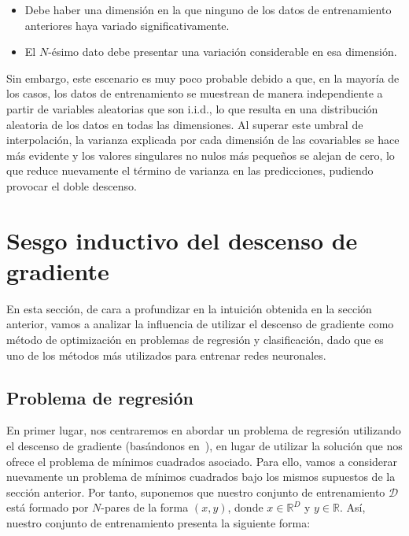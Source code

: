 \begin{itemize}
    \item Debe haber una dimensión en la que ninguno de los datos de entrenamiento anteriores haya variado significativamente.
    \item El $N$-ésimo dato debe presentar una variación considerable en esa dimensión.\newline
\end{itemize}

Sin embargo, este escenario es muy poco probable debido a que, en la mayoría de los casos, los datos de entrenamiento se muestrean de manera independiente a partir de variables aleatorias que son i.i.d., lo que resulta en una distribución aleatoria de los datos en todas las dimensiones. Al superar este umbral de interpolación, la varianza explicada por cada dimensión de las covariables se hace más evidente y los valores singulares no nulos más pequeños se alejan de cero, lo que reduce nuevamente el término de varianza en las predicciones, pudiendo provocar el doble descenso.\newline

\section{Sesgo inductivo del descenso de gradiente}\label{sec:sesgo-implicito-descenso-gradiente}

En esta sección, de cara a profundizar en la intuición obtenida en la sección anterior, vamos a analizar la influencia de utilizar el descenso de gradiente como método de optimización en problemas de regresión y clasificación, dado que es uno de los métodos más utilizados para entrenar redes neuronales.\newline

\subsection{Problema de regresión}\label{subsec:problema-regresion}
En primer lugar, nos centraremos en abordar un problema de regresión utilizando el descenso de gradiente (basándonos en~\cite{Lafon2024}), en lugar de utilizar la solución que nos ofrece el problema de mínimos cuadrados asociado. Para ello, vamos a considerar nuevamente un problema de mínimos cuadrados bajo los mismos supuestos de la sección anterior. Por tanto, suponemos que nuestro conjunto de entrenamiento $\mathcal{D}$ está formado por $N$-pares de la forma $(x, y)$, donde $x \in \mathbb{R}^{D}$ y $y \in \mathbb{R}$. Así, nuestro conjunto de entrenamiento presenta la siguiente forma:

